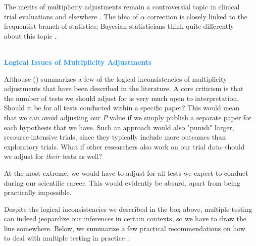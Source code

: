The merits of multiplicity adjustments remain a controversial topic in clinical trial evaluations and elsewhere \citep{rothman1990no, althouse2016adjust, gelman2012we, gelman2013garden}. The idea of $\alpha$ correction is closely linked to the frequentist branch of statistics; Bayesian statisticians think quite differently about this topic \citep{sjolander2019frequentist, gelman2012we}. 

\begin{box-info} \\
\textcolor{dodgerblue}{\textbf{Logical Issues of Multiplicity Adjustments}} 

\vspace{2mm}

Althouse (\citeyear{althouse2016adjust}) summarizes a few of the logical inconsistencies of multiplicity adjustments that have been described in the literature. A core criticism is that the number of tests we should adjust for is very much open to interpretation. Should it be for all tests conducted within a specific paper? This would mean that we can avoid adjusting our $P$ value if we simply publish a separate paper for each hypothesis that we have. Such an approach would also "punish" larger, resource-intensive trials, since they typically include more outcomes than exploratory trials. What if other researchers also work on our trial data--should we adjust for \emph{their} tests as well? 

\vspace{2mm}

\hspace*{5mm} At the most extreme, we would have to adjust for all tests we expect to conduct during our scientific career. This would evidently be absurd, apart from being practically impossible.

\end{box-info}


Despite the logical inconsistencies we described in the box above, multiple testing can indeed jeopardize our inferences in certain contexts, so we have to draw the line somewhere. Below, we summarize a few practical recommendations on how to deal with multiple testing in practice \citep{li2017introduction}:

